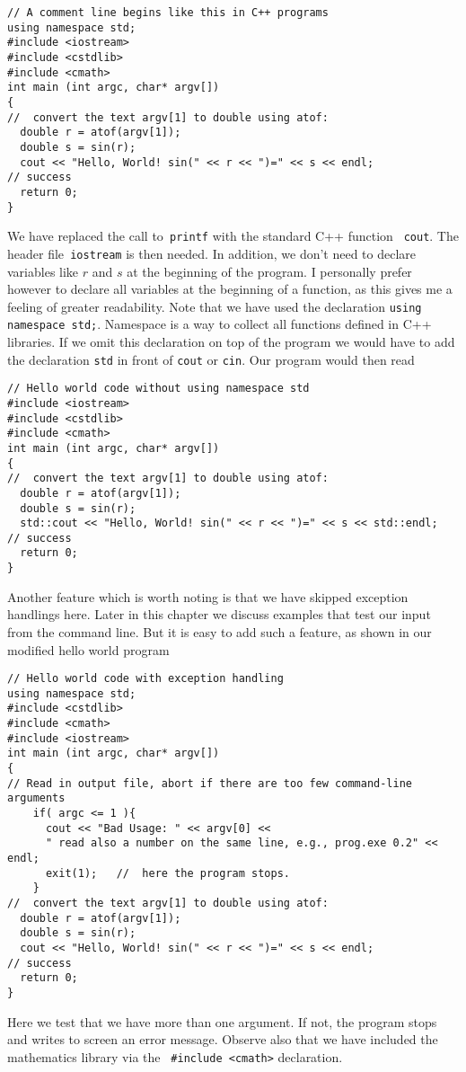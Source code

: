 \begin{lstlisting}[title={\href{{https://github.com/CompPhysics/CompPhysBook1/tree/master/doc/Programs/Chapter2/cpp/program2.cpp}}{Click here to view code}}]
// A comment line begins like this in C++ programs
using namespace std;
#include <iostream>
#include <cstdlib>
#include <cmath>
int main (int argc, char* argv[])
{
//  convert the text argv[1] to double using atof: 
  double r = atof(argv[1]); 
  double s = sin(r);
  cout << "Hello, World! sin(" << r << ")=" << s << endl;
// success 
  return 0;  
}
\end{lstlisting}
We have replaced the call to\verb? printf? with the standard C++ function
\verb? cout?. The header file\verb? iostream? is then needed.
In addition, we don't need to 
declare variables like $r$ and $s$  at the beginning of the program. 
I personally prefer
however to declare all variables at the beginning of a function, as this
gives me a feeling of greater readability.
Note that we have used the declaration \verb?using namespace std;?. Namespace is a 
way to collect 
all functions defined in C++ libraries. If we omit this declaration on top of the program
we would have to add the declaration \verb?std? in front of  
\verb?cout? or \verb?cin?.  Our program would then read
\begin{lstlisting}[title={\href{{https://github.com/CompPhysics/CompPhysBook1/tree/master/doc/Programs/Chapter2/cpp/program3.cpp}}{Click here to view code}}]
// Hello world code without using namespace std
#include <iostream>
#include <cstdlib>
#include <cmath>
int main (int argc, char* argv[])
{
//  convert the text argv[1] to double using atof: 
  double r = atof(argv[1]); 
  double s = sin(r);
  std::cout << "Hello, World! sin(" << r << ")=" << s << std::endl;
// success 
  return 0;  
}
\end{lstlisting}

Another feature which is worth noting is that we have skipped exception handlings here.
Later in this chapter we discuss examples that test our input from the command
line.  But it is easy to add such a feature, as shown in our modified hello world program
\begin{lstlisting}[title={\href{{https://github.com/CompPhysics/CompPhysBook1/tree/master/doc/Programs/Chapter2/cpp/program4.cpp}}{Click here to view code}}]
// Hello world code with exception handling
using namespace std;
#include <cstdlib>
#include <cmath>
#include <iostream>
int main (int argc, char* argv[])
{
// Read in output file, abort if there are too few command-line arguments
    if( argc <= 1 ){
      cout << "Bad Usage: " << argv[0] <<
      " read also a number on the same line, e.g., prog.exe 0.2" << endl;
      exit(1);   //  here the program stops.
    }
//  convert the text argv[1] to double using atof: 
  double r = atof(argv[1]); 
  double s = sin(r);
  cout << "Hello, World! sin(" << r << ")=" << s << endl;
// success 
  return 0;  
}
\end{lstlisting}
Here we test that we have more than one argument. If not, the program stops and writes to screen
an error message. Observe also that we have included the mathematics library via the 
\verb? #include <cmath>?  declaration.



